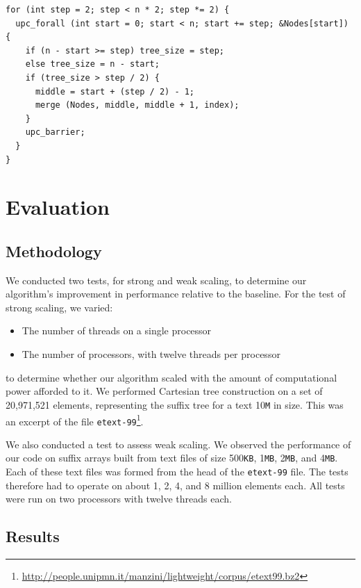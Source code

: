 \documentclass[10pt]{article}
\begin{document}
\lstset{language=C}
\begin{minipage}{\linewidth}
\begin{lstlisting}
for (int step = 2; step < n * 2; step *= 2) {
  upc_forall (int start = 0; start < n; start += step; &Nodes[start]) {
    if (n - start >= step) tree_size = step;
    else tree_size = n - start;
    if (tree_size > step / 2) {
      middle = start + (step / 2) - 1;
      merge (Nodes, middle, middle + 1, index);
    }
    upc_barrier;
  }
}
\end{lstlisting}
\end{minipage}

\section{Evaluation}

\subsection{Methodology}

We conducted two tests, for strong and weak scaling, to determine our algorithm's improvement
in performance relative to the baseline.
For the test of strong scaling, we varied:
\begin{itemize}[noitemsep]
  \item The number of threads on a single processor
  \item The number of processors, with twelve threads per processor
\end{itemize}
to determine whether our algorithm scaled with the amount of computational power afforded to it.
We performed Cartesian tree construction on a set of 20,971,521 elements, representing the suffix
tree for a text 10\texttt{M} in size.
This was an excerpt of the file
\texttt{etext-99}\footnote{\url{http://people.unipmn.it/manzini/lightweight/corpus/etext99.bz2}}.

We also conducted a test to assess weak scaling.
We observed the performance of our code on suffix arrays built from text files of size 
500\texttt{KB}, 1\texttt{MB}, 2\texttt{MB}, and 4\texttt{MB}.
Each of these text files was formed from the head of the \texttt{etext-99} file.
The tests therefore had to operate on about 1, 2, 4, and 8 million elements each.
All tests were run on two processors with twelve threads each.

\subsection{Results}
\end{document}

